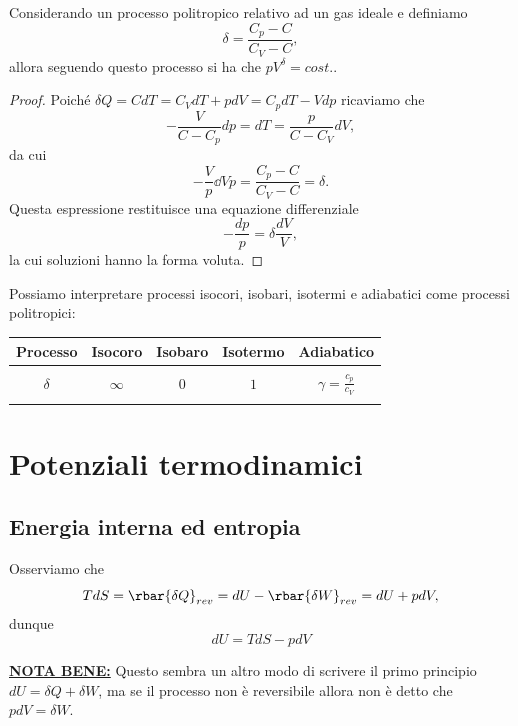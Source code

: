 \begin{proposition}\label{CurveProcessiPolitropici}
Considerando un processo politropico relativo ad un gas ideale e definiamo
\[\delta=\frac{C_p-C}{C_V-C},\]
allora seguendo questo processo si ha che $pV^\delta=cost.$.
\end{proposition}
\begin{proof}
Poich\'e $\delta Q=CdT=C_VdT+pdV=C_pdT-Vdp$ ricaviamo che
\[-\frac V{C-C_p}dp=dT=\frac p{C-C_V}dV,\]
da cui
\[-\frac Vp\dd Vp=\frac{C_p-C}{C_V-C}=\delta.\]
Questa espressione restituisce una equazione differenziale
\[-\frac{dp}p=\delta\frac{dV}V,\]
la cui soluzioni hanno la forma voluta.
\end{proof}

\noindent
Possiamo interpretare processi isocori, isobari, isotermi e adiabatici come processi politropici:
\begin{center}
\begin{tabular}[ht]{|c||c|c|c|c|}
\hline
Processo & Isocoro & Isobaro & Isotermo & Adiabatico\\\hline&&&&\\
$\delta$ & $\infty$ & $0$ & $1$ & $\displaystyle\gamma=\frac{c_p}{c_V}$\\ &&&&\\\hline
\end{tabular}
\end{center}



\section{Potenziali termodinamici}
\subsection{Energia interna ed entropia}

\begin{remark}[Differenziali]
Osserviamo che
\[TdS=\rbar{\delta Q}_{rev}=dU-\rbar{\delta W}_{rev}=dU+pdV,\]
dunque
\[\boxed{dU=TdS-pdV}\]
\end{remark}
\begin{remark}
\underline{\textbf{NOTA BENE:}} Questo sembra un altro modo di scrivere il primo principio $dU=\delta Q+\delta W$, ma se il processo non \`e reversibile allora non \`e detto che $pdV=\delta W$.
\end{remark}

